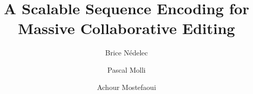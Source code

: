 \documentclass[preprint,5p]{elsarticle}
\begin{document}
\title{A Scalable Sequence Encoding for Massive Collaborative Editing}

\author[lina]{Brice N{\'e}delec}
\author[lina]{Pascal Molli}
\author[lina]{Achour Mostefaoui}

\address[lina]{Universit{\'e} de Nantes, LINA, 2, rue de la Houssini{\`e}re, BP
  92208, 44322 Nantes Cedex 3, France}

\date{}





\maketitle















\appendix


\end{document}
